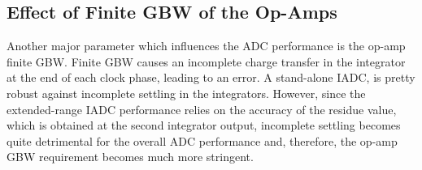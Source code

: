 





 



\subsection{Effect of Finite GBW of the Op-Amps}
Another major parameter which influences the ADC performance is the op-amp finite GBW. Finite GBW causes an incomplete charge transfer in the integrator at the end of each clock phase, leading to an error. A stand-alone IADC, is pretty robust against incomplete settling in the integrators. However, since the extended-range IADC performance relies on the accuracy of the residue value, which is obtained at the second integrator output, incomplete settling becomes quite detrimental for the overall ADC performance and, therefore, the op-amp GBW requirement becomes much more stringent. 


